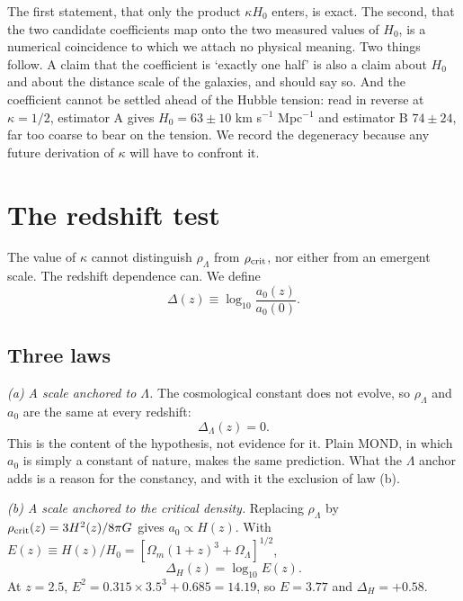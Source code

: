 \documentclass[fleqn,usenatbib]{mnras}
\begin{document}
The first statement, that only the product $\kappa H_0$ enters, is exact. The second, that the two candidate coefficients map onto the two measured values of $H_0$, is a numerical coincidence to which we attach no physical meaning. Two things follow. A claim that the coefficient is `exactly one half' is also a claim about $H_0$ and about the distance scale of the galaxies, and should say so. And the coefficient cannot be settled ahead of the Hubble tension: read in reverse at $\kappa=1/2$, estimator A gives $H_0=63\pm10$ km s$^{-1}$ Mpc$^{-1}$ and estimator B $74\pm24$, far too coarse to bear on the tension. We record the degeneracy because any future derivation of $\kappa$ will have to confront it.

\section{The redshift test}
\label{sec:ztest}
The value of $\kappa$ cannot distinguish $\rho_\Lambda$ from $\rho_{\rm crit}$, nor either from an emergent scale. The redshift dependence can. We define
\begin{equation}
\Delta(z)\equiv\log_{10}\frac{a_0(z)}{a_0(0)} .
\end{equation}

\subsection{Three laws}
\label{sec:laws}
\emph{(a) A scale anchored to $\Lambda$.} The cosmological constant does not evolve, so $\rho_\Lambda$ and $a_0$ are the same at every redshift:
\begin{equation}
\Delta_\Lambda(z)=0 .
\label{eq:lawflat}
\end{equation}
This is the content of the hypothesis, not evidence for it. Plain MOND, in which $a_0$ is simply a constant of nature, makes the same prediction. What the $\Lambda$ anchor adds is a reason for the constancy, and with it the exclusion of law (b).

\emph{(b) A scale anchored to the critical density.} Replacing $\rho_\Lambda$ by $\rho_{\rm crit}(z)=3H^2(z)/8\pi G$ gives $a_0\propto H(z)$. With $E(z)\equiv H(z)/H_0=[\Omega_m(1+z)^3+\Omega_\Lambda]^{1/2}$,
\begin{equation}
\Delta_H(z)=\log_{10}E(z) .
\label{eq:lawH}
\end{equation}
At $z=2.5$, $E^2=0.315\times3.5^3+0.685=14.19$, so $E=3.77$ and $\Delta_H=+0.58$.
\end{document}
